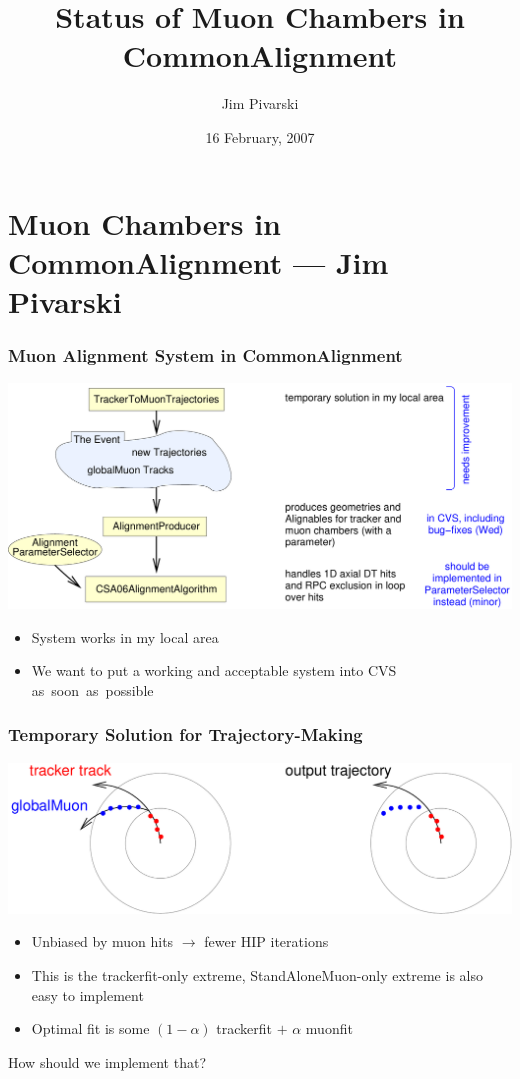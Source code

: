\documentclass[compress]{beamer}
\title{Status of Muon Chambers in CommonAlignment}
\author{Jim Pivarski}
\institute{Texas A\&M University}
\date{16 February, 2007}
\begin{document}
\frame{\titlepage}
\section*{Muon Chambers in CommonAlignment --- Jim Pivarski}



\begin{frame}
  \frametitle{Muon Alignment System in CommonAlignment}

  \includegraphics[width=\linewidth]{system_with_muons}

  \begin{itemize}
    \item System works in my local area
    \item We want to put a working and acceptable system into CVS \mbox{as soon as possible}
  \end{itemize}

\end{frame}


\begin{frame}
  \frametitle{Temporary Solution for Trajectory-Making}

  \includegraphics[width=\linewidth]{making_trajectories}

  \begin{itemize}\setlength{\itemsep}{0.25 cm}
    \item Unbiased by muon hits $\to$ fewer HIP iterations
    \item This is the trackerfit-only extreme, StandAloneMuon-only extreme is also easy to implement
    \item Optimal fit is some $(1-\alpha)$ trackerfit $+$ $\alpha$ muonfit
  \end{itemize}
How should we implement that?
\end{frame}
\end{document}
